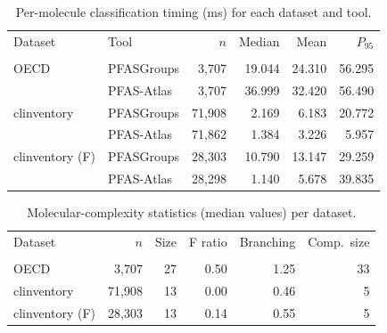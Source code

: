 \begin{table}[htbp]
\centering
\caption{Per-molecule classification timing (ms) for each dataset and tool.}
\label{tab:oecd_clinventory_timing}
\begin{tabular}{llrrrr}
\toprule
Dataset & Tool & $n$ & Median & Mean & $P_{95}$ \\\\
\midrule
OECD & PFASGroups & 3,707 & 19.044 & 24.310 & 56.295 \\
 & PFAS-Atlas & 3,707 & 36.999 & 32.420 & 56.490 \\
\midrule
clinventory & PFASGroups & 71,908 & 2.169 & 6.183 & 20.772 \\
 & PFAS-Atlas & 71,862 & 1.384 & 3.226 & 5.957 \\
\midrule
clinventory (F) & PFASGroups & 28,303 & 10.790 & 13.147 & 29.259 \\
 & PFAS-Atlas & 28,298 & 1.140 & 5.678 & 39.835 \\
\bottomrule
\end{tabular}
\end{table}

\begin{table}[htbp]
\centering
\caption{Molecular-complexity statistics (median values) per dataset.}
\label{tab:oecd_clinventory_complexity}
\begin{tabular}{lrrrrr}
\toprule
Dataset & $n$ & Size & F ratio & Branching & Comp.\ size \\\\
\midrule
OECD & 3,707 & 27 & 0.50 & 1.25 & 33 \\
clinventory & 71,908 & 13 & 0.00 & 0.46 & 5 \\
clinventory (F) & 28,303 & 13 & 0.14 & 0.55 & 5 \\
\bottomrule
\end{tabular}
\end{table}
